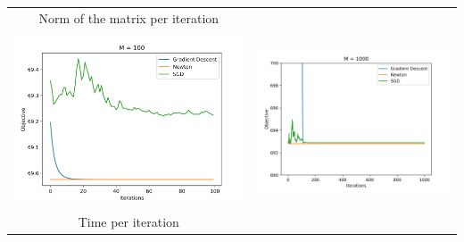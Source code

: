 \documentclass[11pt]{article}
\begin{document}
\begin{tabular}{c c}
Norm of the matrix per iteration\\
\includegraphics[scale=.55]{norm_m_100.png} & \includegraphics[scale=.55]{norm_m_1000.png}\\
Time per iteration\\

\end{tabular}
\end{document}
